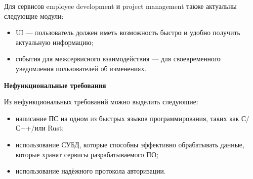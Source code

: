 Для сервисов employee development и project management также актуальны следующие модули:
\begin{itemize}
    \item UI — пользователь должен иметь возможность быстро и удобно получить актуальную информацию;
    \item события для межсервисного взаимодействия — для своевременного уведомления пользователей об изменениях.
\end{itemize}

\bigskip
\textbf{Нефункциональные требования}

Из нефункциональных требований можно выделить следующие:
\begin{itemize}
    \item написание ПС на одном из быстрых языков программирования, таких как С/С++/\csharp или Rust;
    \item использование СУБД, которые способны эффективно обрабатывать данные, которые хранят сервисы разрабатываемого ПО;
    \item использование надёжного протокола авторизации.
\end{itemize}
